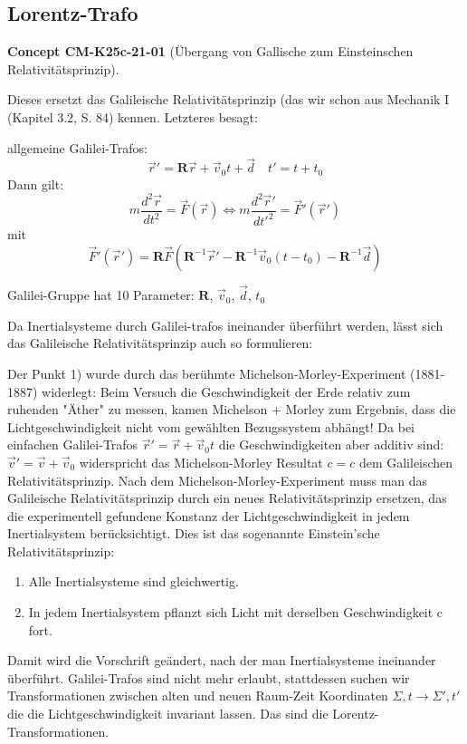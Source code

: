 \documentclass[10pt, letterpaper]{article}
\newcommand{\CustomHeading}[3]{%
  \par\medskip\noindent%
  \textbf{#1 #2} \textnormal{(#3)}.\enskip%
}
\newenvironment{CONC}[2]{\CustomHeading{Concept}{#1}{#2}}{}
\begin{document}
\subsection{Lorentz-Trafo}

\begin{CONC}{CM-K25c-21-01}{Übergang von Gallische zum Einsteinschen Relativitätsprinzip}
Dieses ersetzt das Galileische Relativitätsprinzip (das wir schon aus Mechanik I (Kapitel 3.2, S. 84) kennen. Letzteres besagt:


allgemeine Galilei-Trafos: 
$$\vec{r}' = \mathbf{R}\vec{r} + \vec{v}_0t + \vec{d} \quad t' = t + t_0$$
Dann gilt:
\[m\frac{d^2\vec{r}}{dt^2} = \vec{F}(\vec{r}) \Leftrightarrow m\frac{d^2\vec{r}'}{dt'^2} = \vec{F}'(\vec{r}')\]
mit 
$$\vec{F}'(\vec{r}') = \mathbf{R}\vec{F}(\mathbf{R}^{-1}\vec{r}' - \mathbf{R}^{-1}\vec{v}_0(t-t_0) - \mathbf{R}^{-1}\vec{d})$$

Galilei-Gruppe hat 10 Parameter: $\mathbf{R}$, $\vec{v}_0$, $\vec{d}$, $t_0$

Da Inertialsysteme durch Galilei-trafos ineinander überführt werden, lässt sich das Galileische Relativitätsprinzip auch so formulieren:


Der Punkt 1) wurde durch das berühmte Michelson-Morley-Experiment (1881-1887) widerlegt: Beim Versuch die Geschwindigkeit der Erde relativ zum ruhenden "Äther" zu messen, kamen Michelson + Morley zum Ergebnis, dass die Lichtgeschwindigkeit nicht vom gewählten Bezugssystem abhängt! Da bei einfachen Galilei-Trafos $\vec{r}' = \vec{r} + \vec{v}_0t$ die Geschwindigkeiten aber additiv sind: $\vec{v}' = \vec{v} + \vec{v}_0$ widerspricht das Michelson-Morley Resultat $c = c$ dem Galileischen Relativitätsprinzip.
Nach dem Michelson-Morley-Experiment muss man das Galileische Relativitätsprinzip durch ein neues Relativitätsprinzip ersetzen, das die experimentell gefundene Konstanz der Lichtgeschwindigkeit in jedem Inertialsystem berücksichtigt. Dies ist das sogenannte Einstein'sche Relativitätsprinzip:

\begin{enumerate}
\item Alle Inertialsysteme sind gleichwertig.
\item In jedem Inertialsystem pflanzt sich Licht mit derselben Geschwindigkeit c fort.
\end{enumerate}

Damit wird die Vorschrift geändert, nach der man Inertialsysteme ineinander überführt. Galilei-Trafos sind nicht mehr erlaubt, stattdessen suchen wir Transformationen zwischen alten und neuen Raum-Zeit Koordinaten $\Sigma, t \to \Sigma', t'$ die die Lichtgeschwindigkeit invariant lassen. Das sind die Lorentz-Transformationen.
\end{CONC}
\end{document}
